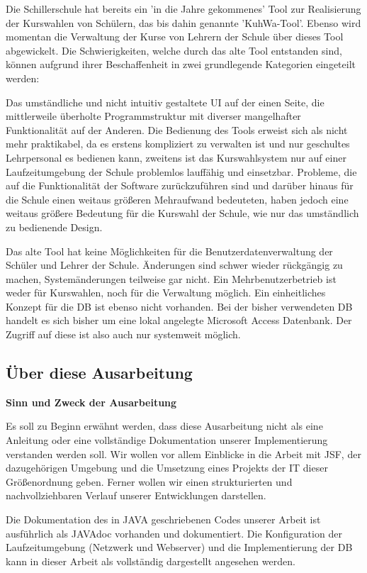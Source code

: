 Die Schillerschule hat bereits ein 'in die Jahre gekommenes' Tool zur Realisierung der Kurswahlen von Schülern, das bis dahin genannte 'KuhWa-Tool'. Ebenso wird momentan die Verwaltung der Kurse von Lehrern der Schule über dieses Tool abgewickelt.
Die Schwierigkeiten, welche durch das alte Tool entstanden sind, können aufgrund ihrer Beschaffenheit in zwei grundlegende Kategorien eingeteilt werden:

Das umständliche und nicht intuitiv gestaltete \ac{UI} auf der einen Seite, die mittlerweile überholte Programmstruktur mit diverser mangelhafter Funktionalität auf der Anderen.
Die Bedienung des Tools erweist sich als nicht mehr praktikabel, da es erstens kompliziert zu verwalten ist und nur geschultes Lehrpersonal es bedienen kann, zweitens ist das Kurswahlsystem nur auf einer Laufzeitumgebung der Schule problemlos lauffähig und einsetzbar.
Probleme, die auf die Funktionalität der Software zurückzuführen sind und darüber hinaus für die Schule einen weitaus größeren Mehraufwand bedeuteten, haben jedoch eine weitaus größere Bedeutung für die Kurswahl der Schule, wie nur das umständlich zu bedienende Design.

Das alte Tool hat keine Möglichkeiten für die Benutzerdatenverwaltung der Schüler und Lehrer der Schule. Änderungen sind schwer wieder rückgängig zu machen, Systemänderungen teilweise gar nicht.
Ein Mehrbenutzerbetrieb ist weder für Kurswahlen, noch für die Verwaltung möglich.
Ein einheitliches Konzept für die \ac{DB} ist ebenso nicht vorhanden.
Bei der bisher verwendeten \ac{DB} handelt es sich bisher um eine lokal angelegte \gls{Microsoft Access Datenbank}. Der Zugriff auf diese ist also auch nur systemweit möglich.

\subsection{Über diese Ausarbeitung}\label{subsec:Uber diese Ausarbeitung}

\textbf{Sinn und Zweck der Ausarbeitung}

Es soll zu Beginn erwähnt werden, dass diese Ausarbeitung nicht als eine Anleitung oder eine vollständige Dokumentation unserer Implementierung verstanden werden soll. Wir wollen vor allem Einblicke in die Arbeit mit \ac{JSF}, der dazugehörigen Umgebung und die Umsetzung eines Projekts der \ac{IT} dieser Größenordnung geben. Ferner wollen wir einen strukturierten und nachvollziehbaren Verlauf unserer Entwicklungen darstellen.

Die Dokumentation des in \gls{JAVA} geschriebenen Codes unserer Arbeit ist ausführlich als \gls{JAVAdoc} vorhanden und dokumentiert. Die Konfiguration der Laufzeitumgebung (Netzwerk und Webserver) und die Implementierung der \ac{DB} kann in dieser Arbeit als vollständig dargestellt angesehen werden.

